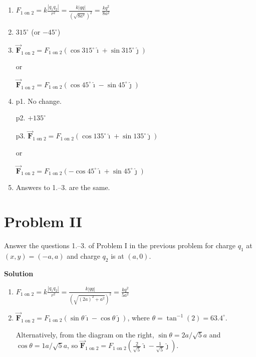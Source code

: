 \documentclass{article}
\renewcommand{\mbox}{\text}
\newcommand{\ds}[0]{\displaystyle}
\newcommand{\ihat}[0]{\hat{\boldsymbol{\imath}}}
\newcommand{\jhat}[0]{\hat{\boldsymbol{\jmath}}}
\newcommand{\bfvec}[1]{\vec{\mathbf{#1}}}
\begin{document}
    \begin{enumerate}

      \item $\ds F_{1\mbox{ on } 2}=k\frac{|q_1q_2|}{r^2}=\frac{k|qq|}{(\sqrt{8a^2})^2}=\frac{kq^2}{8a^2}$

      \item $315^\circ$ (or $-45^\circ$)

      \item $\bfvec{F}_{1\mbox{ on } 2} = F_{1\mbox{ on } 2}(\cos 315^\circ \ihat + \sin 315^\circ \jhat)$

            or

            $\bfvec{F}_{1\mbox{ on } 2} = F_{1\mbox{ on } 2}(\cos 45^\circ \ihat - \sin 45^\circ \jhat)$

      \item p1. No change.

            p2. $+135^\circ$

                p3. 
                   $\bfvec{F}_{1\mbox{ on } 2} = F_{1\mbox{ on } 2}(\cos 135^\circ \ihat + \sin 135^\circ \jhat)$

            or

            $\bfvec{F}_{1\mbox{ on } 2} = F_{1\mbox{ on } 2}(-\cos 45^\circ \ihat + \sin 45^\circ \jhat)$

      \item Answers to 1.--3. are the same.

    \end{enumerate}
\else



\newpage
\fi

\section{Problem II}

Answer the questions 1.--3. of Problem I in the previous problem for charge $q_1$ at $(x,y)=(-a,a)$ and charge $q_2$ is at $(a, 0)$.

\ifsolutions
{\bf Solution}



    \begin{enumerate}

      \item $\ds F_{1\mbox{ on } 2}=k\frac{|q_1q_2|}{r^2}=\frac{k|qq|}{(\sqrt{(2a)^2+a^2})^2}=\frac{kq^2}{5a^2}$

      \item $\bfvec{F}_{1\mbox{ on } 2} = F_{1\mbox{ on } 2}(\sin \theta \ihat - \cos \theta\jhat)$, where $\theta=\tan^{-1}(2) = 63.4^\circ$.

                Alternatively, from the diagram on the right, $\sin\theta = 2a/\sqrt{5}a$ and $\cos\theta = 1a/\sqrt{5}a$, so 
                $\ds\bfvec{F}_{1\mbox{ on } 2} = F_{1\mbox{ on } 2}\left(\frac{2}{\sqrt{5}}\ihat - \frac{1}{\sqrt{5}}\jhat\right)$.

    \end{enumerate}
\else
\end{document}
